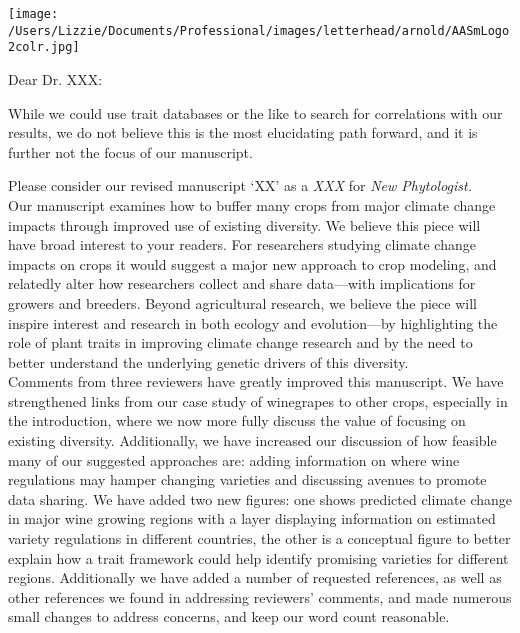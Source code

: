 \documentclass[11pt,a4paper]{letter}
\begin{document}
\begin{letter}{}
\texttt{[image: /Users/Lizzie/Documents/Professional/images/letterhead/arnold/AASmLogo2colr.jpg]}

\opening{Dear Dr. XXX:}

While we could use trait databases or the like to search for correlations with our results, we do not believe this is the most elucidating path forward, and it is further not the focus of our manuscript. 

\noindent Please consider our revised manuscript `XX' as a \emph{XXX} for \emph{New Phytologist.} 
\vspace{1.5ex}\\
Our manuscript examines how to buffer many crops from major climate change impacts through improved use of existing diversity. We believe this piece will have broad interest to your readers. For researchers studying climate change impacts on crops it would suggest a major new approach to crop modeling, and relatedly alter how researchers collect and share data---with implications for growers and breeders. Beyond agricultural research, we believe the piece will inspire interest and research in both ecology and evolution---by highlighting the role of plant traits in improving climate change research and by the need to better understand the underlying genetic drivers of this diversity. 
\vspace{1.5ex}\\
Comments from three reviewers have greatly improved this manuscript. We have strengthened links from our case study of winegrapes to other crops, especially in the introduction, where we now more fully discuss the value of focusing on existing diversity. Additionally, we have increased our discussion of how feasible many of our suggested approaches are: adding information on where wine regulations may hamper changing varieties and discussing avenues to promote data sharing. We have added two new figures: one shows predicted climate change in major wine growing regions with a layer displaying information on estimated variety regulations in different countries, the other is a conceptual figure to better explain how a trait framework could help identify promising varieties for different regions. Additionally we have added a number of requested references, as well as other references we found in addressing reviewers' comments, and made numerous small changes to address concerns, and keep our word count reasonable. 
\vspace{1.5ex}\\

\end{letter}
\end{document}

